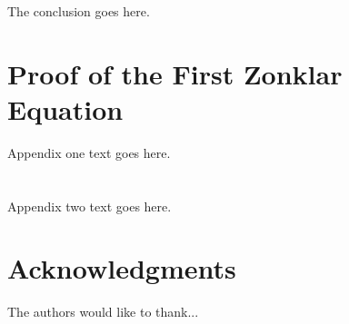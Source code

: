 \documentclass[10pt,journal,compsoc]{IEEEtran}
\begin{document}
The conclusion goes here.



%


\appendices
\section{Proof of the First Zonklar Equation}
Appendix one text goes here.

\section{}
Appendix two text goes here.

\section*{Acknowledgments}

The authors would like to thank...


\ifCLASSOPTIONcaptionsoff
  \newpage
\fi



\end{document}

